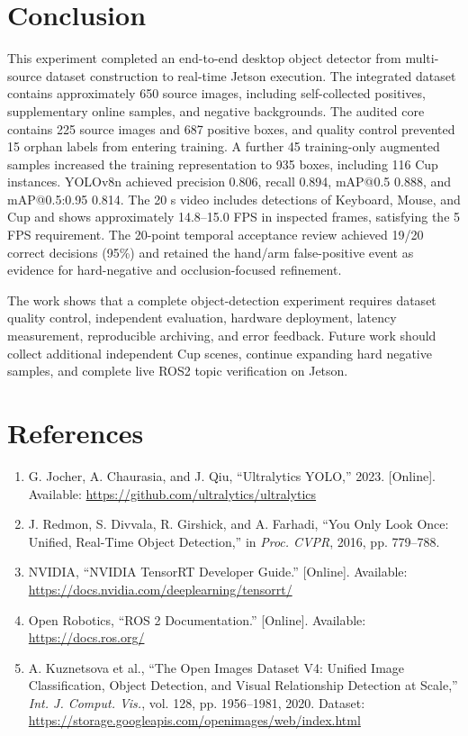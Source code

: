 \documentclass[a4paper,11pt]{article}
\begin{document}
\section{Conclusion}
This experiment completed an end-to-end desktop object detector from multi-source dataset construction to real-time Jetson execution. The integrated dataset contains approximately 650 source images, including self-collected positives, supplementary online samples, and negative backgrounds. The audited core contains 225 source images and 687 positive boxes, and quality control prevented 15 orphan labels from entering training. A further 45 training-only augmented samples increased the training representation to 935 boxes, including 116 Cup instances. YOLOv8n achieved precision 0.806, recall 0.894, mAP@0.5 0.888, and mAP@0.5:0.95 0.814. The 20 s video includes detections of Keyboard, Mouse, and Cup and shows approximately 14.8--15.0 FPS in inspected frames, satisfying the 5 FPS requirement. The 20-point temporal acceptance review achieved 19/20 correct decisions (95\%) and retained the hand/arm false-positive event as evidence for hard-negative and occlusion-focused refinement.

The work shows that a complete object-detection experiment requires dataset quality control, independent evaluation, hardware deployment, latency measurement, reproducible archiving, and error feedback. Future work should collect additional independent Cup scenes, continue expanding hard negative samples, and complete live ROS2 topic verification on Jetson.

\clearpage
\section*{References}
\begin{enumerate}[label={\lbrack\arabic*\rbrack},leftmargin=2.6em,nosep]\small
\item G. Jocher, A. Chaurasia, and J. Qiu, ``Ultralytics YOLO,'' 2023. [Online]. Available: \url{https://github.com/ultralytics/ultralytics}
\item J. Redmon, S. Divvala, R. Girshick, and A. Farhadi, ``You Only Look Once: Unified, Real-Time Object Detection,'' in \emph{Proc. CVPR}, 2016, pp. 779--788.
\item NVIDIA, ``NVIDIA TensorRT Developer Guide.'' [Online]. Available: \url{https://docs.nvidia.com/deeplearning/tensorrt/}
\item Open Robotics, ``ROS 2 Documentation.'' [Online]. Available: \url{https://docs.ros.org/}
\item\label{openimages} A. Kuznetsova et al., ``The Open Images Dataset V4: Unified Image Classification, Object Detection, and Visual Relationship Detection at Scale,'' \emph{Int. J. Comput. Vis.}, vol. 128, pp. 1956--1981, 2020. Dataset: \url{https://storage.googleapis.com/openimages/web/index.html}
\end{enumerate}
\end{document}

